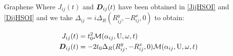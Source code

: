 \begin{section}{Graphene}
Where $J_{ij}(t)$ and $\boldsymbol{D}_{ij}(t)$ have been obtained in \ref{JijHSOI} and \ref{DijHSOI} and we take $\Delta_{ij} = i\Delta_R (R_{ij}^y, - R_{ij}^x, 0)$ to obtain:

\begin{align*}
J_{ij}(t) &= t_0^2\mathcal{M}(\alpha_{ij}, \text{U}, \omega, t) \\
\boldsymbol{D}_{ij}(t) &= -2t_0\Delta_R (R_{ij}^y, - R_{ij}^x, 0) \mathcal{M}(\alpha_{ij}, \text{U}, \omega, t)
\end{align*}

\end{section}
